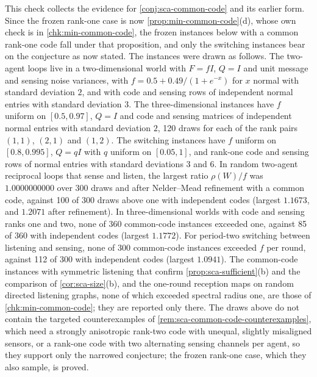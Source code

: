 \begin{numcheck}\label{chk:sca-common-code}
This check collects the evidence for \cref{conj:sca-common-code} and its earlier form. Since the frozen rank-one case is now \cref{prop:min-common-code}(d), whose own check is in \cref{chk:min-common-code}, the frozen instances below with a common rank-one code fall under that proposition, and only the switching instances bear on the conjecture as now stated. The instances were drawn as follows. The two-agent loops live in a two-dimensional world with $F=fI$, $Q=I$ and unit message and sensing noise variances, with $f=0.5+0.49/(1+e^{-x})$ for $x$ normal with standard deviation $2$, and with code and sensing rows of independent normal entries with standard deviation $3$. The three-dimensional instances have $f$ uniform on $[0.5,0.97]$, $Q=I$ and code and sensing matrices of independent normal entries with standard deviation $2$, 120 draws for each of the rank pairs $(1,1)$, $(2,1)$ and $(1,2)$. The switching instances have $f$ uniform on $[0.8,0.995]$, $Q=qI$ with $q$ uniform on $[0.05,1]$, and rank-one code and sensing rows of normal entries with standard deviations $3$ and $6$. In random two-agent reciprocal loops that sense and listen, the largest ratio $\rho(W)/f$ was $1.0000000000$ over 300 draws and after Nelder--Mead refinement with a common code, against 100 of 300 draws above one with independent codes (largest $1.1673$, and $1.2071$ after refinement). In three-dimensional worlds with code and sensing ranks one and two, none of 360 common-code instances exceeded one, against 85 of 360 with independent codes (largest $1.1772$). For period-two switching between listening and sensing, none of 300 common-code instances exceeded $f$ per round, against 112 of 300 with independent codes (largest $1.0941$). The common-code instances with symmetric listening that confirm \cref{prop:sca-sufficient}(b) and the comparison of \cref{cor:sca-size}(b), and the one-round reception maps on random directed listening graphs, none of which exceeded spectral radius one, are those of \cref{chk:min-common-code}; they are reported only there. The draws above do not contain the targeted counterexamples of \cref{rem:sca-common-code-counterexamples}, which need a strongly anisotropic rank-two code with unequal, slightly misaligned sensors, or a rank-one code with two alternating sensing channels per agent, so they support only the narrowed conjecture; the frozen rank-one case, which they also sample, is proved.
\end{numcheck}

